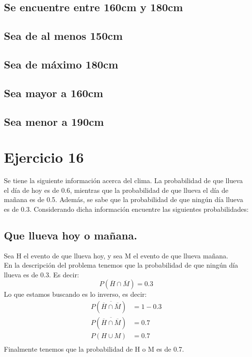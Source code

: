 \documentclass[12pt]{article}
\begin{document}
\subsection{Se encuentre entre 160cm y 180cm}
\subsection{Sea de al menos 150cm}
\subsection{Sea de máximo 180cm}
\subsection{Sea mayor a 160cm}
\subsection{Sea menor a 190cm}
\section{Ejercicio 16}
Se tiene la siguiente información acerca del clima. La probabilidad de que llueva el día de hoy
es de 0.6, mientras que la probabilidad de que llueva el día de mañana es de 0.5. Además, se
sabe que la probabilidad de que ningún día llueva es de 0.3. Considerando dicha información
encuentre las siguientes probabilidades:
\subsection{Que llueva hoy o mañana.}
Sea H el evento de que llueva hoy, y sea M el evento de que llueva mañana.\\
En la descripción del problema tenemos que la probabilidad de que ningún día llueva es de 0.3. Es decir:
\begin{equation}
	P(\overline{H} \cap \overline{M}) = 0.3
\end{equation}
Lo que estamos buscando es lo inverso, es decir:
\begin{equation}
\begin{split}
P(\overline{\overline{H} \cap \overline{M}}) &= 1 - 0.3 \\
P(\overline{\overline{H} \cap \overline{M}}) &= 0.7 \\
P(H \cup M) &= 0.7 \\
\end{split}
\end{equation}
Finalmente tenemos que la probabilidad de H o M es de 0.7.
\end{document}
